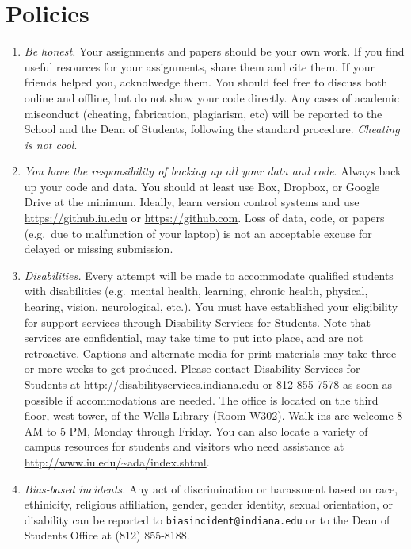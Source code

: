 \documentclass[11pt,article,oneside]{memoir} %
\begin{document}
\section{Policies}%
\begin{enumerate}%

\item \emph{Be honest.} Your assignments and papers should be your own work.  
If you find useful resources for your assignments, share them and cite them. 
If your friends helped you, acknolwedge them. 
You should feel free to discuss both online and offline, but do not show your code directly.  
Any cases of academic misconduct (cheating, fabrication, plagiarism, etc) will be reported to the School and the Dean of Students, following the standard procedure. 
\emph{Cheating is not cool}. 

\item \emph{You have the responsibility of backing up all your data and code}.
Always back up your code and data. You should at least use Box, Dropbox, or Google Drive at the minimum.
Ideally, learn version control systems and use \url{https://github.iu.edu} or \url{https://github.com}. 
Loss of data, code, or papers (e.g.~due to malfunction of your laptop) is not an acceptable excuse for delayed or missing submission. 

\item \emph{Disabilities.} Every attempt will be made to accommodate qualified
students with disabilities (e.g.~mental health, learning, chronic health,
physical, hearing, vision, neurological, etc.). You must have established your
eligibility for support services through Disability Services for Students. Note
that services are confidential, may take time to put into place, and are not
retroactive.  Captions and alternate media for print materials may take three
or more weeks to get produced. Please contact Disability Services for Students
at \url{http://disabilityservices.indiana.edu} or 812-855-7578 as soon as
possible if accommodations are needed. The office is located on the third
floor, west tower, of the Wells Library (Room W302). Walk-ins are welcome 8 AM
to 5 PM, Monday through Friday. You can also locate a variety of campus
resources for students and visitors who need assistance at
\url{http://www.iu.edu/~ada/index.shtml}. 

\item \emph{Bias-based incidents.} Any act of discrimination or harassment based on 
race, ethinicity, religious affiliation, gender, gender identity, sexual orientation, or
disability can be reported to \texttt{biasincident@indiana.edu} or to the Dean of Students Office at (812) 855-8188. 


\end{enumerate}
\end{document}
